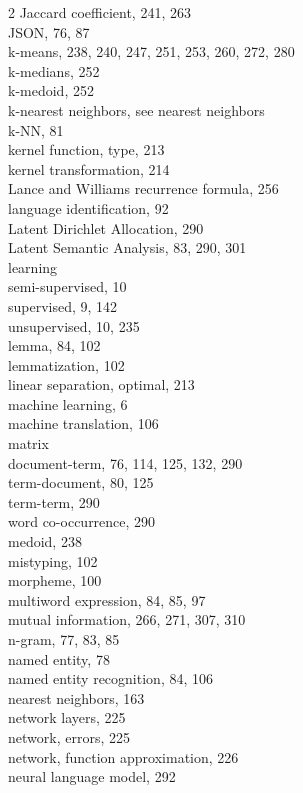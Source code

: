\documentclass[twoside,11pt]{book}
\begin{document}
\begin{multicols}{2}
Jaccard coefficient, 241, 263\\
JSON, 76, 87\\
k-means, 238, 240, 247, 251, 253, 260, 272, 280\\
k-medians, 252\\
k-medoid, 252\\
k-nearest neighbors, see nearest neighbors\\
k-NN, 81\\
kernel function, type, 213\\
kernel transformation, 214\\
Lance and Williams recurrence formula, 256\\
language identification, 92\\
Latent Dirichlet Allocation, 290\\
Latent Semantic Analysis, 83, 290, 301\\
learning\\
semi-supervised, 10\\
supervised, 9, 142\\
unsupervised, 10, 235\\
lemma, 84, 102\\
lemmatization, 102\\
linear separation, optimal, 213\\
machine learning, 6\\
machine translation, 106\\
matrix\\
document-term, 76, 114, 125, 132, 290\\
term-document, 80, 125\\
term-term, 290\\
word co-occurrence, 290\\
medoid, 238\\
mistyping, 102\\
morpheme, 100\\
multiword expression, 84, 85, 97\\
mutual information, 266, 271, 307, 310\\
n-gram, 77, 83, 85\\
named entity, 78\\
named entity recognition, 84, 106\\
nearest neighbors, 163\\
network layers, 225\\
network, errors, 225\\
network, function approximation, 226\\
neural language model, 292\\

\end{multicols}
\end{document}
